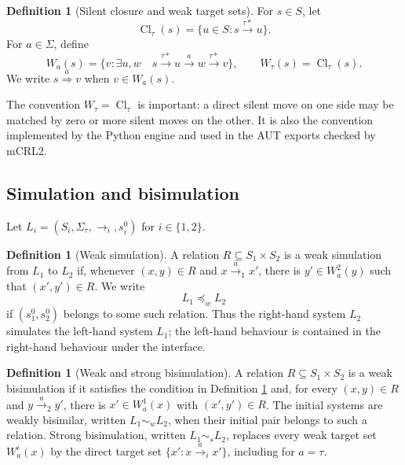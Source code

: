 \documentclass[JMCS,submit]{resources/ISRP}
\theoremstyle{definition}
\newtheorem{definition}[theorem]{Definition}
\theoremstyle{remark}
\numberwithin{equation}{section}
\newcommand{\TAU}{\tau}
\newcommand{\xRightarrow}[1]{\stackrel{#1}{\Longrightarrow}}
\newcommand{\strongsim}{\mathrel{\sim_{s}}}
\newcommand{\weaksim}{\mathrel{\sim_{w}}}
\newcommand{\weakpre}{\mathrel{\preceq_{w}}}
\begin{document}
\begin{definition}[Silent closure and weak target sets]\label{def:weak-move}
For $s\in S$, let
\begin{equation}\label{eq:tau-closure}
 \operatorname{Cl}_{\TAU}(s)=
 \{u\in S:s\xrightarrow{\TAU *}u\}.
\end{equation}
For $a\in\Sigma$, define
\begin{equation}\label{eq:weak-target}
 W_a(s)=\{v:\exists u,w\quad
 s\xrightarrow{\TAU *}u\xrightarrow{a}w\xrightarrow{\TAU *}v\},
 \qquad W_{\TAU}(s)=\operatorname{Cl}_{\TAU}(s).
\end{equation}
We write $s\xRightarrow{a}v$ when $v\in W_a(s)$.
\end{definition}

The convention $W_{\TAU}=\operatorname{Cl}_{\TAU}$ is important: a direct silent
move on one side may be matched by zero or more silent moves on the other. It is
also the convention implemented by the Python engine and used in the AUT exports
checked by mCRL2.

\subsection{Simulation and bisimulation}\label{sec:relations}

Let $L_i=(S_i,\Sigma_{\TAU},\longrightarrow_i,s_i^0)$ for $i\in\{1,2\}$.

\begin{definition}[Weak simulation]\label{def:weak-simulation}
A relation $R\subseteq S_1\times S_2$ is a weak simulation from $L_1$ to $L_2$
if, whenever $(x,y)\in R$ and $x\xrightarrow{a}_1x'$, there is
$y'\in W_a^2(y)$ such that $(x',y')\in R$. We write
\begin{equation}\label{eq:simulation-orientation}
 L_1\weakpre L_2
\end{equation}
if $(s_1^0,s_2^0)$ belongs to some such relation. Thus the right-hand system
$L_2$ simulates the left-hand system $L_1$; the left-hand behaviour is contained
in the right-hand behaviour under the interface.
\end{definition}

\begin{definition}[Weak and strong bisimulation]\label{def:bisimulation}
A relation $R\subseteq S_1\times S_2$ is a weak bisimulation if it satisfies the
condition in Definition \ref{def:weak-simulation} and, for every $(x,y)\in R$ and
$y\xrightarrow{a}_2y'$, there is $x'\in W_a^1(x)$ with $(x',y')\in R$. The
initial systems are weakly bisimilar, written $L_1\weaksim L_2$, when their
initial pair belongs to such a relation. Strong bisimulation, written
$L_1\strongsim L_2$, replaces every weak target set $W_a^i(x)$ by the direct
target set $\{x':x\xrightarrow{a}_i x'\}$, including for $a=\TAU$.
\end{definition}
\end{document}
